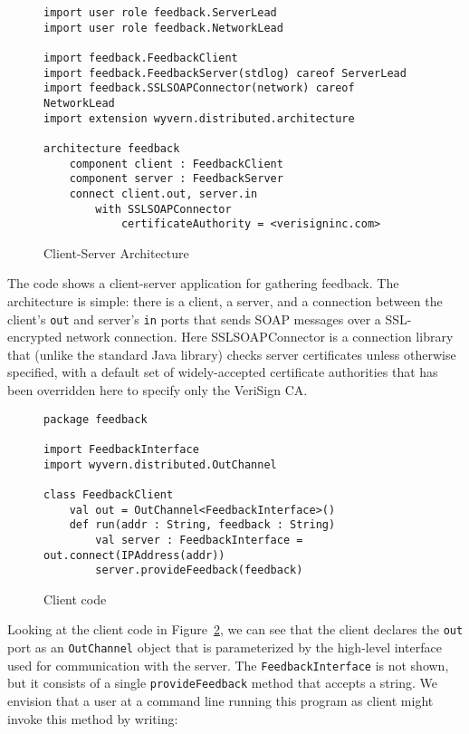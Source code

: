 \documentclass[runningheads]{llncs}
\begin{document}
\begin{sloppypar}
\begin{figure}[t]
\begin{lstlisting}
import user role feedback.ServerLead
import user role feedback.NetworkLead

import feedback.FeedbackClient
import feedback.FeedbackServer(stdlog) careof ServerLead
import feedback.SSLSOAPConnector(network) careof NetworkLead
import extension wyvern.distributed.architecture

architecture feedback
    component client : FeedbackClient
    component server : FeedbackServer
    connect client.out, server.in
        with SSLSOAPConnector
            certificateAuthority = <verisigninc.com>
\end{lstlisting}
\caption{Client-Server Architecture}
\label{f-architecture}
\end{figure}

The code shows a client-server application for gathering feedback.  The architecture is simple: there is a client, a server, and a connection between the client's \texttt{out} and server's \texttt{in} ports that sends SOAP messages over a SSL-encrypted network connection.  Here SSLSOAPConnector is a connection library that (unlike the standard Java library) checks server certificates unless otherwise specified, with a default set of widely-accepted certificate authorities that has been overridden here to specify only the VeriSign CA.



\begin{figure}[t]
\begin{lstlisting}
package feedback

import FeedbackInterface
import wyvern.distributed.OutChannel

class FeedbackClient
    val out = OutChannel<FeedbackInterface>()
    def run(addr : String, feedback : String)
        val server : FeedbackInterface = out.connect(IPAddress(addr))
        server.provideFeedback(feedback)
\end{lstlisting}
\caption{Client code}
\label{f-client}
\end{figure}


Looking at the client code in Figure~\ref{f-client}, we can see that the client declares the \texttt{out} port as an \texttt{OutChannel} object that is parameterized by the high-level interface used for communication with the server.  The \texttt{FeedbackInterface} is not shown, but it consists of a single \texttt{provideFeedback} method that accepts a string.  We envision that a user at a command line running this program as client might invoke this method by writing:


\end{sloppypar}
\end{document}
